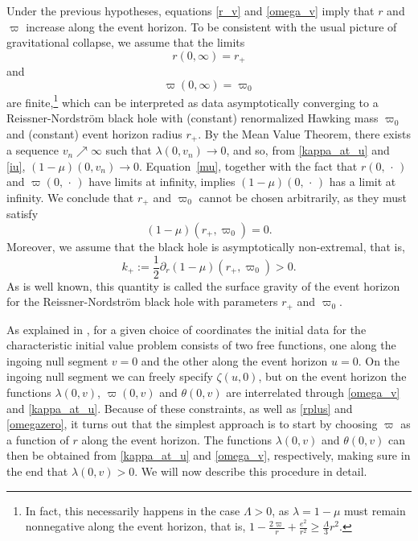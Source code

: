 \documentclass[a4paper,11pt,oneside,reqno]{amsart}
\newcommand{\kk}{k_+}
\begin{document}
Under the previous hypotheses, equations \eqref{r_v} and \eqref{omega_v} imply that $r$ and $\varpi$ increase along the event horizon. To be consistent with the usual picture of gravitational collapse, we assume that the limits
\begin{equation}\label{rplus}
r(0,\infty)=r_+
\end{equation} 
and 
\begin{equation}\label{omegazero}
\varpi(0,\infty)=\varpi_0
\end{equation}
are finite,\footnote{In fact, this necessarily happens in the case $\Lambda>0$, as $\lambda=1-\mu$ must remain nonnegative along the event horizon, that is, $1-\frac{2\varpi}{r}+\frac{e^2}{r^2}\geq\frac{\Lambda}{3}r^2$.} which can be interpreted as data asymptotically converging to a Reissner-Nordstr\"{o}m black hole with (constant) renormalized Hawking mass $\varpi_0$ and (constant) event horizon radius $r_+$.
By the Mean Value Theorem, there exists a sequence $v_n\nearrow\infty$ such that $\lambda(0,v_n)\to 0$, and so, from \eqref{kappa_at_u} and \eqref{iu}, $(1-\mu)(0,v_n)\to 0$.
Equation~\eqref{mu}, together with the fact that $r(0,\,\cdot\,)$ and $\varpi(0,\,\cdot\,)$
have limits at infinity, implies $(1-\mu)(0,\,\cdot\,)$ has a limit at infinity.
We conclude that $r_+$ and $\varpi_0$ cannot be chosen arbitrarily, as they must satisfy
\begin{equation}\label{1mmu=0}
(1-\mu)(r_+,\varpi_0)=0.
\end{equation}
Moreover, we assume that the black hole is asymptotically non-extremal, that is,
$$
\kk:=\frac12\partial_r(1-\mu)(r_+,\varpi_0)>0.
$$
As is well known, this quantity is called the surface gravity of the event horizon for the Reissner-Nordstr\"{o}m black hole with parameters $r_+$ and $\varpi_0$.

As explained in \cite{relIst1}, for a given choice of coordinates the initial data for the characteristic initial value problem consists of two free functions, one along the ingoing null segment $v=0$ and the other along the event horizon $u=0$. On the ingoing null segment we can freely specify $\zeta(u,0)$, but on the event horizon the functions $\lambda(0,v)$, $\varpi(0,v)$ and $\theta(0,v)$ are interrelated through \eqref{omega_v} and \eqref{kappa_at_u}. Because of these constraints, as well as \eqref{rplus} and \eqref{omegazero}, it turns out that the simplest approach is to start by choosing $\varpi$ as a function of $r$ along the event horizon. The functions $\lambda(0,v)$ and $\theta(0,v)$ can then be obtained from \eqref{kappa_at_u} and \eqref{omega_v}, respectively, making sure in the end that $\lambda(0,v) > 0$. We will now describe this procedure in detail.
\end{document}
